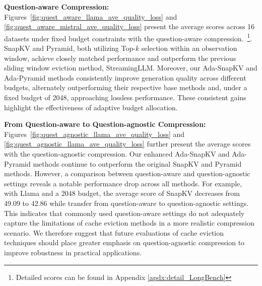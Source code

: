 \textbf{Question-aware Compression:} Figures~\ref{fig:quest_aware_llama_ave_quality_loss} and \ref{fig:quest_aware_mistral_ave_quality_loss} present the average scores across 16 datasets under fixed budget constraints with the question-aware compression.~\footnote{Detailed scores can be found in Appendix \ref{apdx:detail_LongBench}}. SnapKV and Pyramid, both utilizing Top-$k$ selection within an observation window, achieve closely matched performance and outperform the previous sliding window eviction method, StreamingLLM. Moreover, our Ada-SnapKV and Ada-Pyramid methods consistently improve generation quality across different budgets, alternately outperforming their respective base methods and, under a fixed budget of 2048, approaching lossless performance. These consistent gains highlight the effectiveness of adaptive budget allocation.


\textbf{From Question-aware to Question-agnostic Compression:} Figures~\ref{fig:quest_agnostic_llama_ave_quality_loss} and \ref{fig:quest_agnostic_llama_ave_quality_loss} further present the average scores with the question-agnostic compression. Our enhanced Ada-SnapKV and Ada-Pyramid methods continue to outperform the original SnapKV and Pyramid methods. However, a comparison between question-aware and question-agnostic settings reveals a notable performance drop across all methods. For example, with Llama and a 2048 budget, the average score of SnapKV decreases from 49.09 to 42.86 while transfer from question-aware to question-agnostic settings. This indicates that commonly used question-aware settings do not adequately capture the limitations of cache eviction methods in a more realistic compression scenario. We therefore suggest that future evaluations of cache eviction techniques should place greater emphasis on question-agnostic compression to improve robustness in practical applications.



